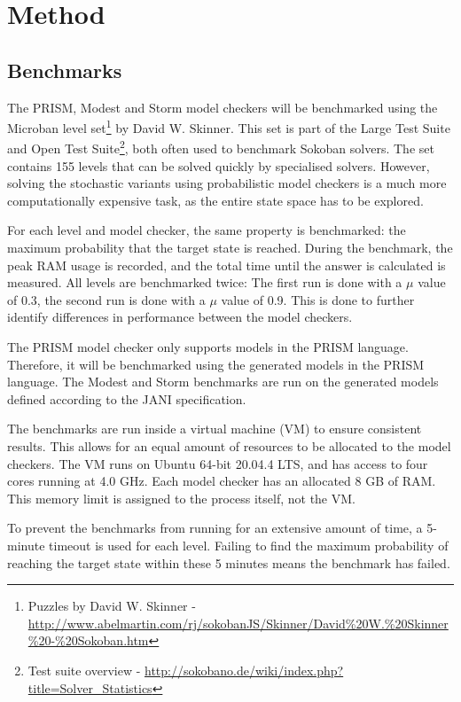 \section{Method}
\subsection{Benchmarks}
The PRISM, Modest and Storm model checkers will be benchmarked using the Microban level set\footnote{Puzzles by David W. Skinner - \url{http://www.abelmartin.com/rj/sokobanJS/Skinner/David\%20W.\%20Skinner\%20-\%20Sokoban.htm}} by David W. Skinner. This set is part of the Large Test Suite and Open Test Suite\footnote{Test suite overview - \url{http://sokobano.de/wiki/index.php?title=Solver_Statistics}}, both often used to benchmark Sokoban solvers. The set contains 155 levels that can be solved quickly by specialised solvers. However, solving the stochastic variants using probabilistic model checkers is a much more computationally expensive task, as the entire state space has to be explored.

For each level and model checker, the same property is benchmarked: the maximum probability that the target state is reached. During the benchmark, the peak RAM usage is recorded, and the total time until the answer is calculated is measured. All levels are benchmarked twice: The first run is done with a $\mu$ value of 0.3, the second run is done with a $\mu$ value of 0.9. This is done to further identify differences in performance between the model checkers.

The PRISM model checker only supports models in the PRISM language. Therefore, it will be benchmarked using the generated models in the PRISM language. The Modest and Storm benchmarks are run on the generated models defined according to the JANI specification.

The benchmarks are run inside a virtual machine (VM) to ensure consistent results. This allows for an equal amount of resources to be allocated to the model checkers. The VM runs on Ubuntu 64-bit 20.04.4 LTS, and has access to four cores running at 4.0 GHz. Each model checker has an allocated 8 GB of RAM. This memory limit is assigned to the process itself, not the VM.

To prevent the benchmarks from running for an extensive amount of time, a 5-minute timeout is used for each level. Failing to find the maximum probability of reaching the target state within these 5 minutes means the benchmark has failed.

